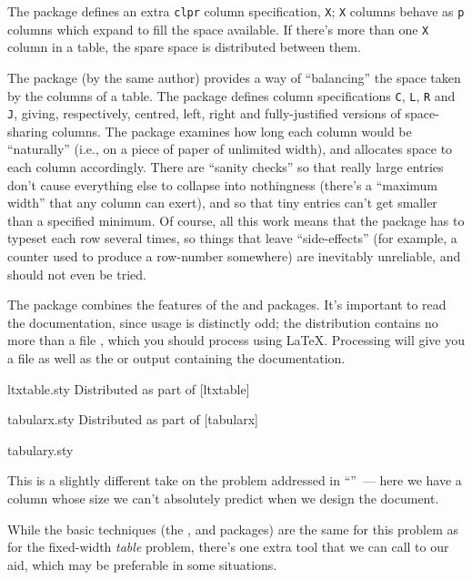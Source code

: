 The  package defines an extra \texttt{clpr} column
specification, \texttt{X}; \texttt{X} columns behave as \texttt{p}
columns which expand to fill the space available.  If there's more
than one \texttt{X} column in a table, the spare space is distributed
between them.

The  package (by the same author) provides a way of
``balancing'' the space taken by the columns of a table.  The package
defines column specifications \texttt{C}, \texttt{L}, \texttt{R} and
\texttt{J}, giving, respectively, centred, left, right and
fully-justified versions of space-sharing columns.  The package
examines how long each column would be ``naturally'' (i.e., on a piece of paper of unlimited width), and
allocates space to each column accordingly.  There are ``sanity
checks'' so that really large entries don't cause everything else to
collapse into nothingness (there's a ``maximum width'' that any column
can exert), and so that tiny entries can't get smaller than a
specified minimum.  Of course, all this work means that the package
has to typeset each row several times, so things that leave
``side-effects'' (for example, a counter used to produce a row-number
somewhere) are inevitably unreliable, and should not even be tried.

The  package combines the features of the
 and  packages.  It's important
to read the documentation, since usage is distinctly odd; the
distribution contains no more than a file , which you
should process using \LaTeX{}.  Processing will give you a 
file as well as the  or  output containing the
documentation.
\begin{ctanrefs}
\item[ltxtable.sty]Distributed as part of [ltxtable]
\item[tabularx.sty]Distributed as part of [tabularx]
\item[tabulary.sty]
\end{ctanrefs}


This is a slightly different take on the problem addressed in
``''~--- here we have
a column whose size we can't absolutely predict when we design the
document.

While the basic techniques (the , 
and  packages) are the same for this problem as for the
fixed-width \emph{table} problem, there's one extra tool that we can
call to our aid, which may be preferable in some situations.

